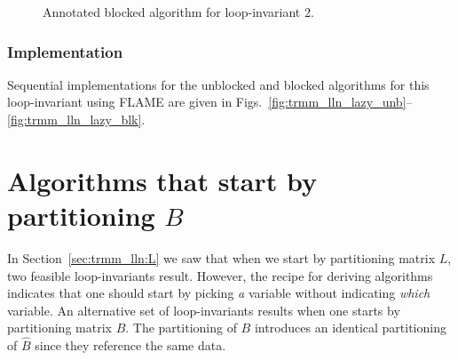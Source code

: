 \renewcommand{\beforeupdate}{
\FlaTwoByOne{ 
\FlaTwoByOneSingleLine{ B_0 }{ B_1 }
}
{
B_2
} =
\FlaTwoByOne{ 
\FlaTwoByOneSingleLine{ \hat{B}_0 }{ \hat{B}_1 }
}
{
\FlaOneByTwoSingleLine{L_{20}}{L_{21}}
\FlaTwoByOneSingleLine{\hat{B}_0}{ \hat{B}_1 } +
L_{22} \hat{B}_2
}
\wedge \ldots
}

\renewcommand{\afterupdate}{
\FlaTwoByOne{ 
B_0
}
{
\FlaTwoByOneSingleLine{ B_1 }{ B_2 }
} =
\FlaTwoByOne{ 
\hat{B}_0
}
{
\FlaTwoByOneSingleLine{ L_{10} }{ L_{20} }
\hat{B}_0 +
\FlaTwoByTwoSingleLine{ L_{11} }{ L_{12} }
                      { L_{21} }{ L_{22} }
\FlaTwoByOneSingleLine{ \hat{B}_1 }{ \hat{B}_2 }
}
\wedge \ldots
}

\renewcommand{\update}{
\begin{minipage}[t]{4in}
\noindent
$ B_1 \becomes L_{10} B_0 + L_{11} B_1 $\\
\end{minipage}
}

\begin{figure}[htbp]
\worksheet
\caption{Annotated blocked algorithm for loop-invariant 2.}
\label{fig:ws:ltrmm_lln:var2:blk}
\end{figure}
%

\subsubsection{Implementation}

Sequential implementations for the unblocked and blocked algorithms
for this loop-invariant using FLAME are given in
Figs.~\ref{fig:trmm_lln_lazy_unb}--\ref{fig:trmm_lln_lazy_blk}.

\section{Algorithms that start by partitioning $ B $}

In Section~\ref{sec:trmm_lln:L} we saw that when we start by
partitioning matrix $ L $, two feasible loop-invariants result.
However, the recipe for deriving algorithms indicates that one should
start by picking {\em a} variable without indicating {\em which}
variable.  An alternative set of loop-invariants results when one
starts by partitioning matrix $ B $.  The partitioning of $ B $
introduces an identical partitioning of $ \hat{B} $ since they
reference the same data.

